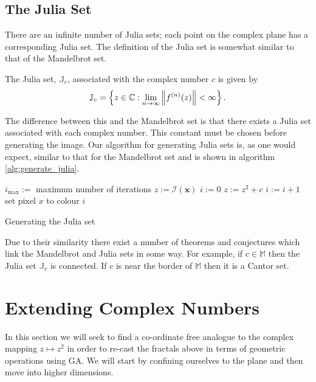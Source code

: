 \subsection{The Julia Set}

There are an infinite number of Julia sets; each point on the complex plane
has a corresponding Julia set. The definition of the Julia set is somewhat
similar to that of the Mandelbrot set.

\begin{definition}
The Julia set, $\mathbb{J}_c$, associated
with the complex number $c$ is given by
\[
\mathbb{J}_c = 
\left\{z \in \mathbb{C}
: \lim_{n \rightarrow \infty} \left\Vert f^{(n)}(z) \right\Vert < \infty \right\}.
\]
\end{definition}

The difference between this and the Mandelbrot set is that there exists a 
Julia set associated with each complex number. This constant must be chosen before
generating the image. Our algorithm for generating Julia sets is, as one would
expect, similar to that for the Mandelbrot set and is shown in algorithm
\ref{alg:generate_julia}.

\begin{fancyalg}
\begin{algorithmic}[1]
\STATE $i_{\mathrm{max}} :=$ maximum number of iterations
\STATE $z := {\mathcal I}(\mathbf{x})$
\STATE $i := 0$
  \STATE $z := z^2 + c$
  \STATE $i := i+1$
\ENDWHILE 
\STATE set pixel $x$ to colour $i$
\ENDFOR
\end{algorithmic}
\caption{
\label{alg:generate_julia}
  Generating the Julia set}
\end{fancyalg}

Due to their similarity there exist a number of theorems and conjectures which link the
Mandelbrot and Julia sets in some way. For example, if $c \in \mathbb{M}$ then
the Julia set $\mathbb{J}_c$ is connected\cite{FRAC:JuliaAndMandelbrotSets}.
If $c$ is near the border of $\mathbb{M}$ then it is a Cantor
set\cite{FRAC:JuliaAndMandelbrotSets}.

\section{Extending Complex Numbers}

In this section we will seek to find a co-ordinate free analogue to the
complex mapping $z \mapsto z^2$ in order to re-cast the fractals above in
terms of geometric operations using GA. We will start by confining ourselves
to the plane and then move into higher dimensions.

